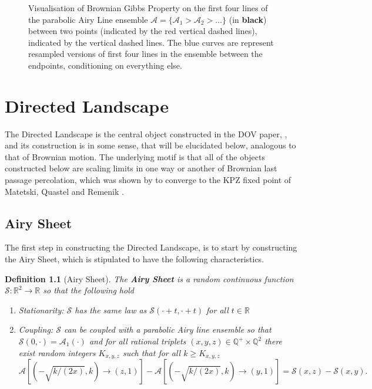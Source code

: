 \documentclass[12pt]{report}
\theoremstyle{plain}
\newtheorem{definition}{Definition}[section]
\newcommand{\R}{\ensuremath{\mathbb{R}}}
\newcommand{\Q}{\ensuremath{\mathbb{Q}}}
\begin{document}
\begin{figure}[H]
  \centering
  
  

  \caption{Visualisation of Brownian Gibbs Property on the first four lines of the parabolic Airy Line ensemble \(\mathcal{A} = \{\mathcal{A}_1>\mathcal{A}_2>\dots\}\) (in \textbf{black}) between two points (indicated by the \color{red}red \color{black} vertical dashed lines), indicated by the vertical dashed lines. The \color{blue}blue \color{black} curves are represent resampled versions of first four lines in the ensemble between the endpoints, conditioning on everything else.}
  \label{fig: Gibbs}
\end{figure}%


\chapter{Directed Landscape}\label{Directed Landscape}

The Directed Landscape is the central object constructed in the DOV paper, \cite{DOV}, and its construction is in some sense, that will be elucidated below, analogous to that of Brownian motion. The underlying motif is that all of the objects constructed below are scaling limits in one way or another of Brownian last passage percolation, which was shown by \cite{nica2020one} to converge to the KPZ fixed point of Matetski, Quastel and Remenik \cite{matetski2021kpz}.

\section{Airy Sheet}\label{sec:Airy sheet}

The first step in constructing the Directed Landscape, is to start by constructing the Airy Sheet, which is stipulated to have the following characteristics.

\begin{definition}[Airy Sheet]\label{def: Airy Sheet}
    The \textbf{Airy Sheet} is a random continuous function \(\mathcal{S}:\R^2\to \R\) so that the following hold
    \begin{enumerate}
        \item Stationarity: \(\mathcal{S}\) has the same law as \(\mathcal{S}(\cdot+t, \cdot+t)\) for all \(t\in \R\)
        \item Coupling: \(\mathcal{S}\) can be coupled with a parabolic Airy line ensemble so that \(\mathcal{S}(0,\cdot) = \mathcal{A}_1(\cdot)\) and for all rational triplets \((x,y,z)\in \Q^{+}\times\Q^2\) there exist random integers \(K_{x,y,z}\) such that for all \(k\geq K_{x,y,z}\)
        \begin{equation}\label{eq: coupling}
        \mathcal{A}[(-\sqrt{k/(2x)}, k) \to (z,1) ] -  \mathcal{A}[(-\sqrt{k/(2x)}, k) \to (y,1) ]= \mathcal{S}(x, z) - \mathcal{S}(x, y).
        \end{equation}
    \end{enumerate}
\end{definition}%
\end{document}
